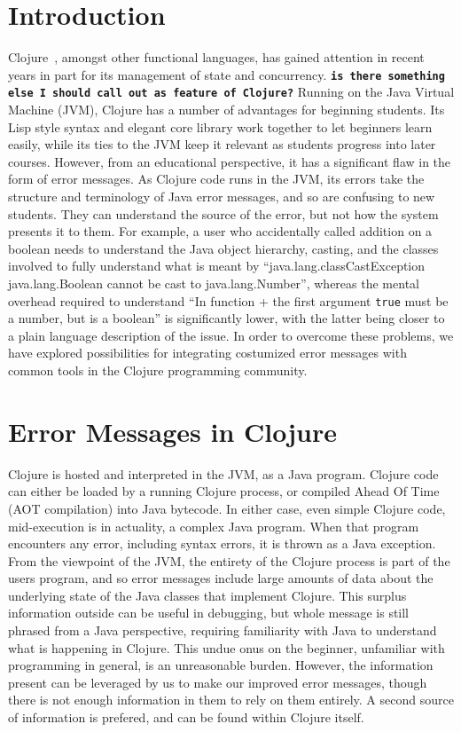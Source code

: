 \documentclass[12pt]{article}
\newcommand{\comment}[1]{{\bf \tt  {#1}}}
\begin{document}
\newpage
\setcounter{page}{1}

\section{Introduction}
Clojure~\cite{Hickey:2008}, amongst other functional languages, has gained attention in recent years
in part for its management of state and concurrency. \comment{is there something else I should call out as feature of Clojure?}
Running on the Java Virtual Machine (JVM), Clojure has a number of advantages for beginning students.
Its Lisp style syntax and elegant core library work together to let beginners learn easily, while
its ties to the JVM keep it relevant as students progress into later courses.
However, from an educational perspective, it has a significant flaw in the form of error messages.
As Clojure code runs in the JVM, its errors take the structure and terminology of Java error messages,
and so are confusing to new students. They can understand the source of the error,
but not how the system presents it to them.
For example, a user who accidentally called addition on a boolean needs
 to understand the Java object hierarchy, casting,
 and the classes involved to fully understand what is meant by
 ``java.lang.classCastException java.lang.Boolean cannot be cast to java.lang.Number'',
whereas the mental overhead required to understand
``In function + the first argument {\tt true} must be a number, but is a boolean''
 is significantly lower, with the latter being closer to a plain language
 description of the issue.
 In order to overcome these problems,
 we have explored possibilities for integrating costumized error messages
 with common tools in the Clojure programming community.

\section{Error Messages in Clojure}
Clojure is hosted and interpreted in the JVM, as a Java program.
Clojure code can either be loaded by a running Clojure process, or
compiled Ahead Of Time (AOT compilation) into Java bytecode. In either case,
even simple Clojure code, mid-execution is in actuality, a complex Java program.
When that program encounters any error, including syntax errors, it is thrown as a Java exception.
From the viewpoint of the JVM, the entirety of the Clojure process is
part of the users program, and so error messages include large amounts
of data about the underlying state of the Java classes that implement Clojure.
This surplus information outside can be useful in debugging,
but whole message is still phrased from a Java perspective, requiring familiarity with Java
to understand what is happening in Clojure.
This undue onus on the beginner,
unfamiliar with programming in general, is an unreasonable burden.
However, the information present can be leveraged by us to make our improved
error messages, though there is not enough information in them to rely on them entirely.
A second source of information is prefered, and can be found within Clojure itself.
\end{document}
